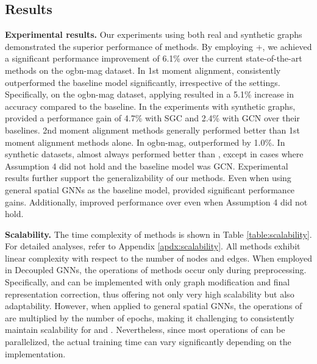 \subsection{Results}




\textbf{Experimental results.} Our experiments using both real and synthetic graphs demonstrated the superior performance of \IMPaCT methods. By employing \PMP+\JJnorm, we achieved a significant performance improvement of 6.1\% over the current state-of-the-art methods on the ogbn-mag dataset. In 1st moment alignment, \PMP consistently outperformed the baseline model significantly, irrespective of the settings. Specifically, on the ogbn-mag dataset, applying \PMP resulted in a 5.1\% increase in accuracy compared to the baseline. In the experiments with synthetic graphs, \PMP provided a performance gain of 4.7\% with SGC and 2.4\% with GCN over their baselines. 2nd moment alignment methods generally performed better than 1st moment alignment methods alone. In ogbn-mag, \JJnorm outperformed \PMP by 1.0\%. In synthetic datasets, \JJnorm almost always performed better than \PNY, except in cases where Assumption 4 did not hold and the baseline model was GCN. Experimental results further support the generalizability of our methods. Even when using general spatial GNNs as the baseline model, \IMPaCT provided significant performance gains. Additionally, \JJnorm improved performance over \PMP even when Assumption 4 did not hold. %


\textbf{Scalability.} The time complexity of \IMPaCT methods is shown in Table \ref{table:scalability}. For detailed analyses, refer to Appendix \ref{apdx:scalability}. All methods exhibit linear complexity with respect to the number of nodes and edges. When employed in Decoupled GNNs, the operations of \IMPaCT methods occur only during preprocessing. Specifically, \PMP and \JJnorm can be implemented with only graph modification and final representation correction, thus offering not only very high scalability but also adaptability. However, when applied to general spatial GNNs, the operations of \IMPaCT are multiplied by the number of epochs, making it challenging to consistently maintain scalability for \PNY and \JJnorm. Nevertheless, since most operations of \IMPaCT can be parallelized, the actual training time can vary significantly depending on the implementation.
